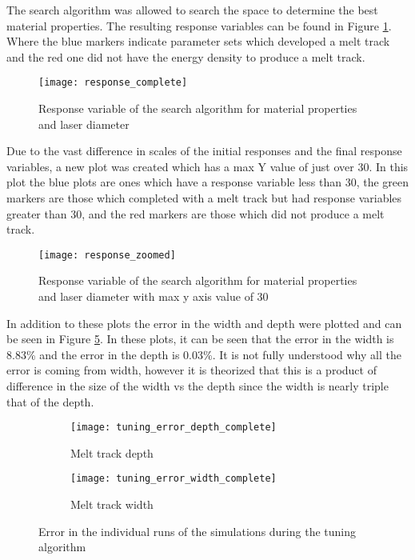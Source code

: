 \label{results}

The search algorithm was allowed to search the space to determine the best material properties.  The resulting response variables can be found in Figure \ref{fig:response_complete}.  Where the blue markers indicate parameter sets which developed a melt track and the red one did not have the energy density to produce a melt track.
\begin{figure}[!htb]
	\centering
	\texttt{[image: response\_complete]}
	\caption{Response variable of the search algorithm for material properties and laser diameter}
	\label{fig:response_complete}
\end{figure}
Due to the vast difference in scales of the initial responses and the final response variables, a new plot was created which has a max Y value of just over 30.  In this plot the blue plots are ones which have a response variable less than 30, the green markers are those which completed with a melt track but had response variables greater than 30, and the red markers are those which did not produce a melt track.
\begin{figure}[!htb]
	\centering
	\texttt{[image: response\_zoomed]}
	\caption{Response variable of the search algorithm for material properties and laser diameter with max y axis value of 30}
	\label{fig:response_zoomed}
\end{figure}
In addition to these plots the error in the width and depth were plotted and can be seen in Figure \ref{fig:tuning_error_complete}.  In these plots, it can be seen that the error in the width is 8.83\% and the error in the depth is 0.03\%.  It is not fully understood why all the error is coming from width, however it is theorized that this is a product of difference in the size of the width vs the depth since the width is nearly triple that of the depth.
\begin{figure}[!htb]\centering
	\begin{subfigure}[c]{0.475\textwidth}\centering
	\texttt{[image: tuning\_error\_depth\_complete]}
	\caption{Melt track depth}
	\label{fig:tuning_error_depth_complete}
	\end{subfigure}\hfill{}
		\begin{subfigure}[c]{0.475\textwidth}\centering
		\texttt{[image: tuning\_error\_width\_complete]}
		\caption{Melt track width}
		\label{fig:tuning_error_width_complete}
		\end{subfigure}
	\caption{Error in the individual runs of the simulations during the tuning algorithm}
	\label{fig:tuning_error_complete}
\end{figure}

